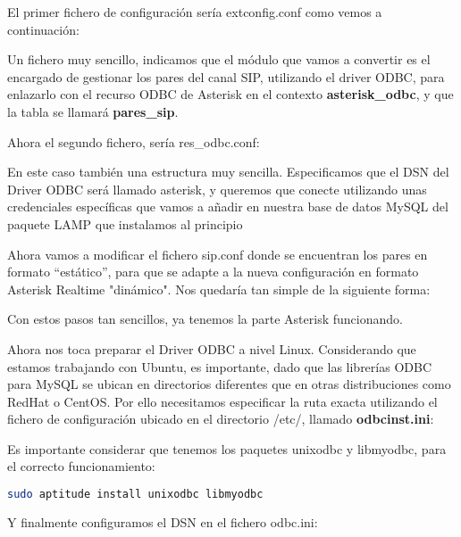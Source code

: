 El primer fichero de configuración sería extconfig.conf como vemos a continuación:



Un fichero muy sencillo, indicamos que el módulo que vamos a convertir es el encargado de gestionar los pares del canal SIP, utilizando el driver ODBC, para enlazarlo con el recurso ODBC de Asterisk en el contexto \textbf{asterisk\_odbc}, y que la tabla se llamará \textbf{pares\_sip}.

Ahora el segundo fichero, sería res\_odbc.conf:



En este caso también una estructura muy sencilla. Especificamos que el DSN del Driver ODBC será llamado asterisk, y queremos que conecte utilizando unas credenciales específicas que vamos a añadir en nuestra base de datos MySQL del paquete LAMP que instalamos al principio

Ahora vamos a modificar el fichero sip.conf donde se encuentran los pares en formato ``estático'', para que se adapte a la nueva configuración en formato Asterisk Realtime "dinámico". Nos quedaría tan simple de la siguiente forma:



Con estos pasos tan sencillos, ya tenemos la parte Asterisk funcionando.

Ahora nos toca preparar el Driver ODBC a nivel Linux. Considerando que estamos trabajando con Ubuntu, es importante, dado que las librerías ODBC para MySQL se ubican en directorios diferentes que en otras distribuciones como RedHat o CentOS. Por ello necesitamos especificar la ruta exacta utilizando el fichero de configuración ubicado en el directorio /etc/, llamado \textbf{odbcinst.ini}:



Es importante considerar que tenemos los paquetes unixodbc y libmyodbc, para el correcto funcionamiento:

\begin{lstlisting}[language=sh]
sudo aptitude install unixodbc libmyodbc
\end{lstlisting}

Y finalmente configuramos el DSN en el fichero odbc.ini:



